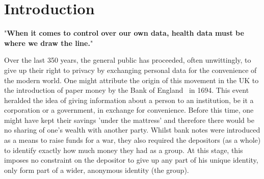 \section{Introduction}

\begin{displayquote}{
  "\textbf{When it comes to control over our own data, health data must be where we draw the line.}"~\parencite{wilbankstopol:2016:article}
}\end{displayquote}

Over the last 350 years, the general public has proceeded, often unwittingly, to give up their right to privacy by exchanging personal data for the convenience of the modern world. One might attribute the origin of this movement in the UK to the introduction of paper money by the Bank of England~\parencite{bankofengland:2016:online} in 1694. This event heralded the idea of giving information about a person to an institution, be it a corporation or a government, in exchange for convenience. Before this time, one might have kept their savings 'under the mattress' and therefore there would be no sharing of one's wealth with another party. Whilst bank notes were introduced as a means to raise funds for a war, they also required the depositors (as a whole) to identify exactly how much money they had as a group. At this stage, this imposes no constraint on the depositor to give up any part of his unique identity, only form part of a wider, anonymous identity (the group).



